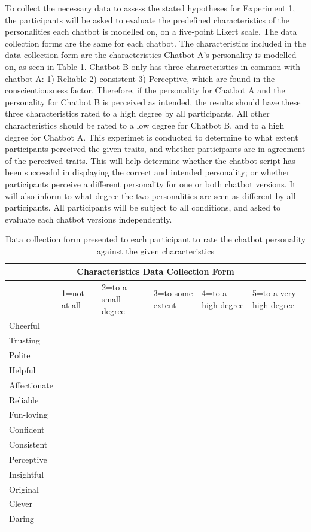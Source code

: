 To collect the necessary data to assess the stated hypotheses for Experiment 1, the participants will be asked to evaluate the predefined characteristics of the personalities each chatbot is modelled on, on a five-point Likert scale. The data collection forms are the same for each chatbot. The characteristics included in the data collection form are the characteristics Chatbot A's personality is modelled on, as seen in Table \ref{tab:datacolchar}. Chatbot B only has three characteristics in common with chatbot A: 1) Reliable 2) consistent 3) Perceptive, which are found in the conscientiousness factor. Therefore, if the personality for Chatbot A and the personality for Chatbot B is perceived as intended, the results should have these three characteristics rated to a high degree by all participants. All other characteristics should be rated to a low degree for Chatbot B, and to a high degree for Chatbot A. This experimet is conducted to determine to what extent participants perceived the given traits, and whether participants are in agreement of the perceived traits. This will help determine whether the chatbot script has been successful in displaying the correct and intended personality; or whether participants perceive a different personality for one or both chatbot versions. It will also inform to what degree the two personalities are seen as different by all participants. All participants will be subject to all conditions, and asked to evaluate each chatbot versions independently. 

\vspace{2,5mm}

\begin{table}[]
    \centering
\begin{tabular}{|p{2cm}|p{2cm}|p{2cm}|p{2cm}|p{2cm}|p{2cm}|}
 \hline
 \multicolumn{6}{|c|}{Characteristics Data Collection Form} \\
 \hline
& 1=not at all & 2=to a small degree & 3=to some extent & 4=to a high degree & 5=to a very high degree \\
\hline
Cheerful & & & & & \\
\hline
Trusting & & & & & \\
\hline
Polite & & & & & \\
\hline
Helpful & & & & & \\
\hline
Affectionate & & & & & \\
\hline
Reliable & & & & & \\
\hline
Fun-loving & & & & & \\
\hline
Confident & & & & & \\
\hline
Consistent & & & & & \\
\hline
Perceptive & & & & & \\
\hline
Insightful & & & & & \\
\hline
Original & & & & & \\
\hline
Clever & & & & & \\
\hline
Daring & & & & & \\
\hline
\end{tabular}
 \caption{Data collection form presented to each participant to rate the chatbot personality against the given characteristics}
    \label{tab:datacolchar}
\end{table}


